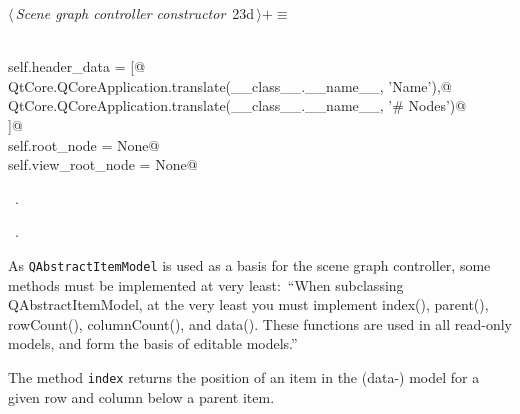 \documentclass[
    a4paper,      %
    10pt,         %
    openright,    %
    notitlepage,  %
    parskip=half, %
]{scrreprt}       %
\theoremstyle{definition}                    %
\begin{document}
\begin{flushleft} \small
\begin{minipage}{\linewidth}\label{scrap21}\raggedright\small
{} $\langle\,${\itshape Scene graph controller constructor}\nobreak\ {\footnotesize {23d}}$\,\rangle+\equiv$
\vspace{-1ex}
\begin{list}{}{} \item
\mbox{}\lstinline@@\\
\mbox{}\lstinline@    self.header_data = [@\\
\mbox{}\lstinline@        QtCore.QCoreApplication.translate(__class__.__name__, 'Name'),@\\
\mbox{}\lstinline@        QtCore.QCoreApplication.translate(__class__.__name__, '# Nodes')@\\
\mbox{}\lstinline@    ]@\\
\mbox{}\lstinline@    self.root_node = None@\\
\mbox{}\lstinline@    self.view_root_node = None@\\
\mbox{}\lstinline@@{\NWsep}
\end{list}
\vspace{-1.5ex}
\footnotesize
\begin{list}{}{\setlength{\itemsep}{-\parsep}\setlength{\itemindent}{-\leftmargin}}
\item \NWtxtMacroDefBy\ .
\item \NWtxtMacroRefIn\ .

\item{}
\end{list}
\end{minipage}\vspace{4ex}
\end{flushleft}

As \verb+QAbstractItemModel+ is used as a basis for the scene graph controller,
some methods must be implemented at very least:~\enquote{When subclassing
QAbstractItemModel, at the very least you must implement index(), parent(),
rowCount(), columnCount(), and data(). These functions are used in all read-only
models, and form the basis of editable
models.}

The method \verb+index+ returns the position of an item in the (data-) model for
a given row and column below a parent item.
\end{document}
